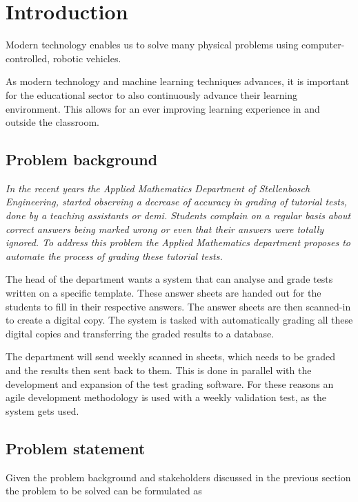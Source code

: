\chapter{Introduction}
\label{ch:Introduction}
\graphicspath{{Chapter1/Chapter1Figures/}}

Modern technology enables us to solve many physical problems using computer-controlled, robotic vehicles.

As modern technology and machine learning techniques advances, it is important for the educational sector to also continuously advance their learning environment. This allows for an ever improving learning experience in and outside the classroom. 

\section{Problem background}

\textsl{In the recent years the Applied Mathematics Department of Stellenbosch Engineering, started observing a decrease of accuracy in grading of tutorial tests, done by a teaching assistants or demi. Students complain on a regular basis about correct answers being marked wrong or even that their answers were totally ignored. To address this problem the Applied Mathematics department proposes to automate the process of grading these tutorial tests.}

The head of the department wants a system that can analyse and grade tests written on a specific template. These answer sheets are handed out for the students to fill in their respective answers. The answer sheets are then scanned-in to create a digital copy. The system is tasked with automatically grading all these digital copies and transferring the graded results to a database.

The department will send weekly scanned in sheets, which needs to be graded and the results then sent back to them. This is done in parallel with the development and expansion of the test grading software. For these reasons an agile development methodology is used with a weekly validation test, as the system gets used. 

\section{Problem statement}
\label{sec:problemStatement}

Given the problem background and stakeholders discussed in the previous section the problem to be solved can be formulated as
\newline
\newline
\noindent{}

